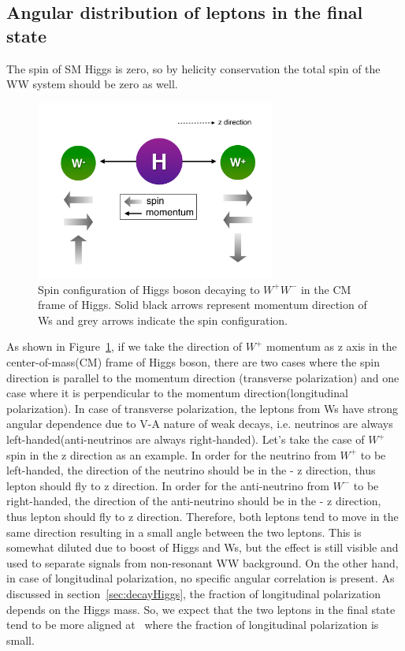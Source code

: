 %
\subsection{Angular distribution of leptons in the final state}
\label{subsec:angular_dist}

The spin of SM Higgs is zero, so by helicity conservation the total spin 
of the WW system should be zero as well. 
\begin{figure}[htp]
\centering
\includegraphics[width=0.7\textwidth]{figures/HiggsSpin.pdf}
\caption{Spin configuration of Higgs boson decaying to $W^+W^-$ in the CM frame of Higgs.
Solid black arrows represent momentum direction of Ws and grey arrows indicate 
the spin configuration.}
\label{fig:HiggsSpin}
\end{figure}
As shown in Figure~\ref{fig:HiggsSpin}, if we take 
the direction of $W^+$ momentum as z axis in the center-of-mass(CM) frame of Higgs boson,
there are two cases where the spin direction is parallel to the 
momentum direction (transverse polarization) and one case where 
it is perpendicular to the momentum direction(longitudinal polarization). 
In case of transverse polarization, the leptons from Ws have strong 
angular dependence due to V-A nature of weak decays, i.e. neutrinos 
are always left-handed(anti-neutrinos are always right-handed). 
Let's take the case of $W^+$ spin in the z direction as an example.
In order for the neutrino from $W^+$ to be left-handed, the direction 
of the neutrino should be in the - z direction, thus lepton should 
fly to z direction. In order for the anti-neutrino from $W^-$ to be 
right-handed, the direction of the anti-neutrino should be in the 
- z direction, thus lepton should fly to z direction.
Therefore, both leptons tend to move in the same direction 
resulting in a small angle between the two leptons. 
This is somewhat diluted due to boost of Higgs and Ws, 
but the effect is still visible and used to separate signals 
from non-resonant WW background. 
On the other hand, in case of longitudinal polarization, 
no specific angular correlation is present. 
As discussed in section~\ref{sec:decayHiggs}, the fraction of longitudinal 
polarization depends on the Higgs mass. So, we expect that the two leptons 
in the final state tend to be more aligned at \mHi\ where the fraction of longitudinal 
polarization is small. 


